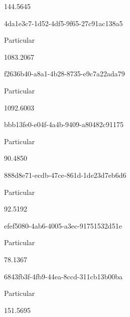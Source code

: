 \documentclass[
  11pt,
  a4paper,
  DIV=11,
  numbers=noendperiod]{scrartcl}
\begin{document}
144.5645

\n    

\n    

\n      

4da1e3c7-1d52-4df5-9f65-27c91ac138a5

\n      

Particular

\n      

1083.2067

\n    

\n    

\n      

f2636b40-a8a1-4b28-8735-e9c7a22ada79

\n      

Particular

\n      

1092.6003

\n    

\n    

\n      

bbb13fe0-e04f-4a4b-9409-a80482c91175

\n      

Particular

\n      

90.4850

\n    

\n    

\n      

888d8e71-ecdb-47ce-861d-1de23d7eb6d6

\n      

Particular

\n      

92.5192

\n    

\n    

\n      

efef5080-4ab6-4005-a3ec-91751532d51e

\n      

Particular

\n      

78.1367

\n    

\n    

\n      

6843fb3f-4fb9-44ea-8ccd-311cb13b00ba

\n      

Particular

\n      

151.5695
\end{document}
